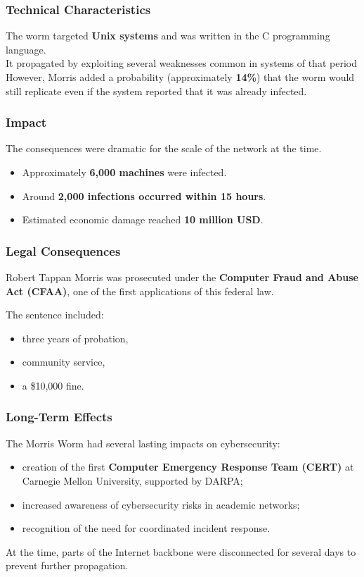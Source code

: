 \subsubsection*{Technical Characteristics}

The worm targeted \textbf{Unix systems} and was written in the C programming language.
\\
It propagated by exploiting several weaknesses common in systems of that period\\
However, Morris added a probability (approximately \textbf{14\%}) that the worm would still replicate even if the system reported that it was already infected. 

\subsubsection*{Impact}

The consequences were dramatic for the scale of the network at the time.

\begin{itemize}
\item Approximately \textbf{6,000 machines} were infected.
\item Around \textbf{2,000 infections occurred within 15 hours}.
\item Estimated economic damage reached \textbf{10 million USD}.
\end{itemize}

\subsubsection*{Legal Consequences}

Robert Tappan Morris was prosecuted under the \textbf{Computer Fraud and Abuse Act (CFAA)}, one of the first applications of this federal law.

\noindent
The sentence included:
\begin{itemize}
\item three years of probation,
\item community service,
\item a \$10,000 fine.
\end{itemize}

\subsubsection*{Long-Term Effects}

The Morris Worm had several lasting impacts on cybersecurity:

\begin{itemize}
\item creation of the first \textbf{Computer Emergency Response Team (CERT)} at Carnegie Mellon University, supported by DARPA;
\item increased awareness of cybersecurity risks in academic networks;
\item recognition of the need for coordinated incident response.
\end{itemize}

\noindent
At the time, parts of the Internet backbone were disconnected for several days to prevent further propagation.

